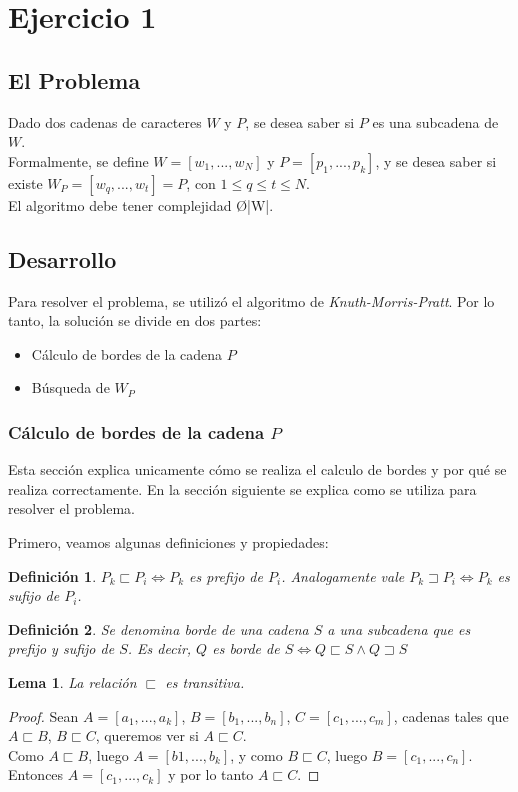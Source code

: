\newtheorem*{definition}{Definición}
\newtheorem{lem}{Lema}
\section{Ejercicio 1}
\subsection{El Problema}
Dado dos cadenas de caracteres $W$ y $P$, se desea saber si $P$ es una subcadena de $W$.\\
Formalmente, se define $W = [w_1,...,w_N]$ y $P = [p_1,...,p_k]$, y se desea saber si existe $W_P = [w_q,...,w_t] = P$, con $1 \leq q \leq t \leq N$.\\
El algoritmo debe tener complejidad \O{|W|}.

\subsection{Desarrollo}
Para resolver el problema, se utilizó el algoritmo de \emph{Knuth-Morris-Pratt}.
Por lo tanto, la solución se divide en dos partes:
\begin{itemize}
	\item Cálculo de bordes de la cadena $P$
	\item Búsqueda de $W_P$
\end{itemize}

\subsubsection{Cálculo de bordes de la cadena $P$}
Esta sección explica unicamente cómo se realiza el calculo de bordes y por qué se realiza correctamente. En la sección siguiente se explica como se utiliza para resolver el problema.

Primero, veamos algunas definiciones y propiedades:
\begin{definition}
$P_k \sqsubset P_i \Leftrightarrow P_k$ es prefijo de $P_i$. Analogamente vale $P_k \sqsupset P_i \Leftrightarrow P_k$ es sufijo de $P_i$.
\end{definition}
\begin{definition}
Se denomina borde de una cadena $S$ a una subcadena que es prefijo y sufijo de $S$. Es decir, $Q$ es borde de $S \Leftrightarrow Q \sqsubset S \wedge Q \sqsupset S$
\end{definition}

\begin{lem}
La relación $\sqsubset$ es transitiva.
\end{lem}
\begin{proof}
Sean $A = [a_1,...,a_k]$, $B = [b_1,...,b_n]$, $C = [c_1,...,c_m]$, cadenas tales que $A \sqsubset B$, $B \sqsubset C$, queremos ver si $A \sqsubset C$.\\
Como $A \sqsubset B$, luego $A = [b1,...,b_k]$, y como $B \sqsubset C$, luego $B = [c_1,...,c_n]$. Entonces $A = [c_1,...,c_k]$ y por lo tanto $A \sqsubset C$.
\end{proof}

